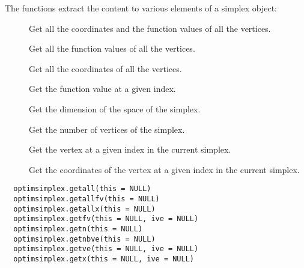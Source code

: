 %
\begin{Description}\relax
The functions extract the content to various elements of a simplex object:
\begin{description}

\item[] Get all the coordinates and the function
values of all the vertices.
\item[] Get all the function values of all the
vertices.
\item[] Get all the coordinates of all the
vertices.
\item[] Get the function value at a given index.
\item[] Get the dimension of the space of the
simplex.
\item[] Get the number of vertices of the
simplex.
\item[] Get the vertex at a given index in the
current simplex.
\item[] Get the coordinates of the vertex at a given
index in the current simplex.

\end{description}

\end{Description}
%
\begin{Usage}
\begin{verbatim}
  optimsimplex.getall(this = NULL)
  optimsimplex.getallfv(this = NULL)
  optimsimplex.getallx(this = NULL)
  optimsimplex.getfv(this = NULL, ive = NULL)
  optimsimplex.getn(this = NULL)
  optimsimplex.getnbve(this = NULL)
  optimsimplex.getve(this = NULL, ive = NULL)
  optimsimplex.getx(this = NULL, ive = NULL)
\end{verbatim}
\end{Usage}
